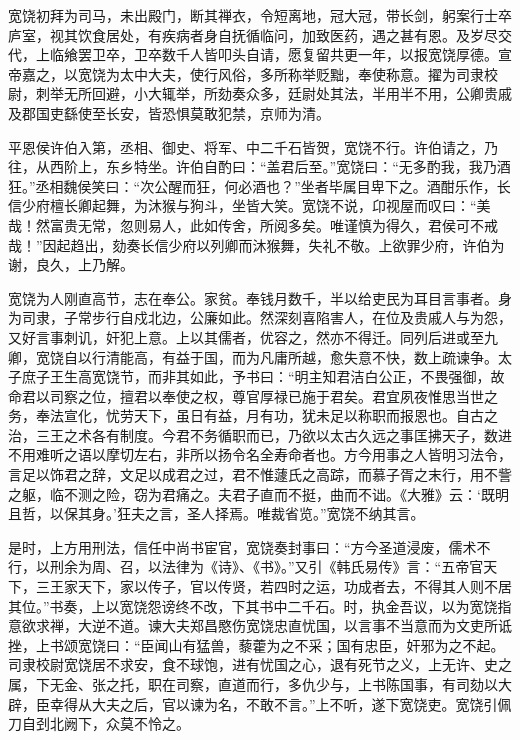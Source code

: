 \documentclass[12pt,UTF8]{ctexbook}
\begin{document}
宽饶初拜为司马，未出殿门，断其禅衣，令短离地，冠大冠，带长剑，躬案行士卒庐室，视其饮食居处，有疾病者身自抚循临问，加致医药，遇之甚有恩。及岁尽交代，上临飨罢卫卒，卫卒数千人皆叩头自请，愿复留共更一年，以报宽饶厚德。宣帝嘉之，以宽饶为太中大夫，使行风俗，多所称举贬黜，奉使称意。擢为司隶校尉，刺举无所回避，小大辄举，所劾奏众多，廷尉处其法，半用半不用，公卿贵戚及郡国吏繇使至长安，皆恐惧莫敢犯禁，京师为清。



平恩侯许伯入第，丞相、御史、将军、中二千石皆贺，宽饶不行。许伯请之，乃往，从西阶上，东乡特坐。许伯自酌曰：“盖君后至。”宽饶曰：“无多酌我，我乃酒狂。”丞相魏侯笑曰：“次公醒而狂，何必酒也？”坐者毕属目卑下之。酒酣乐作，长信少府檀长卿起舞，为沐猴与狗斗，坐皆大笑。宽饶不说，卬视屋而叹曰：“美哉！然富贵无常，忽则易人，此如传舍，所阅多矣。唯谨慎为得久，君侯可不戒哉！”因起趋出，劾奏长信少府以列卿而沐猴舞，失礼不敬。上欲罪少府，许伯为谢，良久，上乃解。



宽饶为人刚直高节，志在奉公。家贫。奉钱月数千，半以给吏民为耳目言事者。身为司隶，子常步行自戍北边，公廉如此。然深刻喜陷害人，在位及贵戚人与为怨，又好言事刺讥，奸犯上意。上以其儒者，优容之，然亦不得迁。同列后进或至九卿，宽饶自以行清能高，有益于国，而为凡庸所越，愈失意不快，数上疏谏争。太子庶子王生高宽饶节，而非其如此，予书曰：“明主知君洁白公正，不畏强御，故命君以司察之位，擅君以奉使之权，尊官厚禄已施于君矣。君宜夙夜惟思当世之务，奉法宣化，忧劳天下，虽日有益，月有功，犹未足以称职而报恩也。自古之治，三王之术各有制度。今君不务循职而已，乃欲以太古久远之事匡拂天子，数进不用难听之语以摩切左右，非所以扬令名全寿命者也。方今用事之人皆明习法令，言足以饰君之辞，文足以成君之过，君不惟蘧氏之高踪，而慕子胥之末行，用不訾之躯，临不测之险，窃为君痛之。夫君子直而不挺，曲而不诎。《大雅》云：‘既明且哲，以保其身。’狂夫之言，圣人择焉。唯裁省览。”宽饶不纳其言。



是时，上方用刑法，信任中尚书宦官，宽饶奏封事曰：“方今圣道浸废，儒术不行，以刑余为周、召，以法律为《诗》、《书》。”又引《韩氏易传》言：“五帝官天下，三王家天下，家以传子，官以传贤，若四时之运，功成者去，不得其人则不居其位。”书奏，上以宽饶怨谤终不改，下其书中二千石。时，执金吾议，以为宽饶指意欲求禅，大逆不道。谏大夫郑昌愍伤宽饶忠直忧国，以言事不当意而为文吏所诋挫，上书颂宽饶曰：“臣闻山有猛兽，藜藿为之不采；国有忠臣，奸邪为之不起。司隶校尉宽饶居不求安，食不球饱，进有忧国之心，退有死节之义，上无许、史之属，下无金、张之托，职在司察，直道而行，多仇少与，上书陈国事，有司劾以大辟，臣幸得从大夫之后，官以谏为名，不敢不言。”上不听，遂下宽饶吏。宽饶引佩刀自刭北阙下，众莫不怜之。
\end{document}
